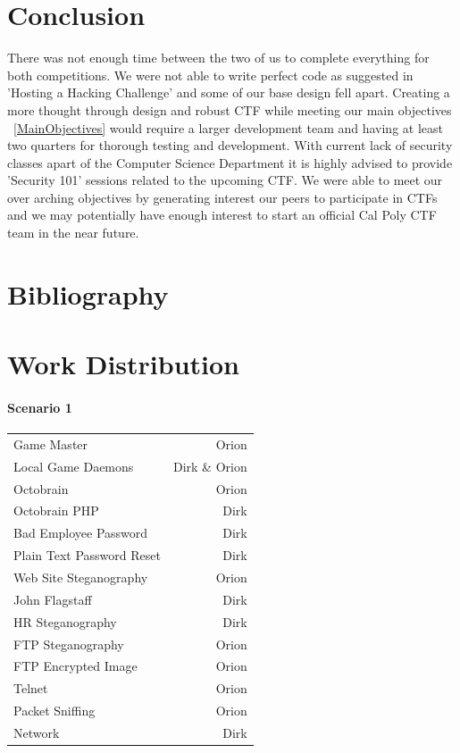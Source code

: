 \documentclass[10pt]{article}
\begin{document}
\section{Conclusion}
There was not enough time between the two of us to complete everything for both
competitions. We were not able to write perfect code as suggested in 'Hosting a Hacking 
Challenge' \cite{HostingHackingChallenge} and some of our base design fell apart. 
Creating a more thought through design and robust CTF while meeting our main objectives 
~\ref{MainObjectives} would require a larger development team and having at least 
two quarters for thorough testing and development. With current lack of security classes
apart of the Computer Science Department it is highly advised to provide 'Security 101' 
sessions related to the upcoming CTF. We were able to meet our over arching 
objectives by generating interest our peers to participate in CTFs and we may 
potentially have enough interest to start an official Cal Poly CTF team in the near future.

\newpage
\nocite{*}
\section{Bibliography}





\newpage
\thispagestyle{empty}

\section*{Work Distribution}

\paragraph*{Scenario 1}

\begin{tabular}{l r}
   Game Master & Orion \\
   Local Game Daemons & Dirk \& Orion \\
   Octobrain & Orion \\
   Octobrain PHP & Dirk \\
   Bad Employee Password & Dirk \\
   Plain Text Password Reset & Dirk \\
   Web Site Steganography & Orion \\
   John Flagstaff & Dirk \\
   HR Steganography & Dirk \\
   FTP Steganography & Orion \\
   FTP Encrypted Image & Orion \\
   Telnet & Orion \\
   Packet Sniffing & Orion \\
   Network & Dirk \\
\end{tabular}
\end{document}
